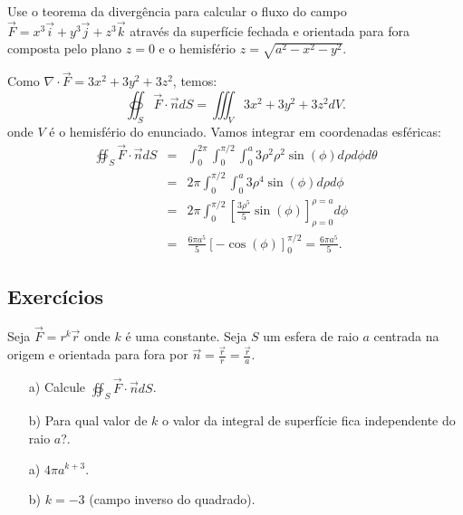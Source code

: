 \begin{exeresol} Use o teorema da divergência para calcular o fluxo do campo $\vec{F}=x^3\vec{i}+y^3\vec{j}+z^3\vec{k}$ através da superfície fechada e orientada para fora composta pelo plano $z=0$ e o hemisfério  $z=\sqrt{a^2-x^2-y^2}$.
\end{exeresol}
\begin{resol}
Como $\nabla\cdot \vec{F}=3x^2+3y^2+3z^2$, temos: 
$$
\oiint_S \vec{F}\cdot \vec{n} dS=\iiint_V 3x^2+3y^2+3z^2 dV.
$$
onde $V$ é o hemisfério do enunciado. Vamos integrar em coordenadas esféricas:
\begin{eqnarray*}
\oiint_S \vec{F}\cdot \vec{n} dS&=&\int_0^{2\pi} \int_0^{\pi/2} \int_0^a 3\rho^2 \rho^2\sin(\phi)d\rho d\phi d\theta\\
&=&2\pi \int_0^{\pi/2} \int_0^a 3\rho^4\sin(\phi)d\rho d\phi \\
&=&2\pi \int_0^{\pi/2} \left[ \frac{3\rho^5}{5}\sin(\phi)\right]_{\rho=0}^{\rho=a} d\phi \\
&=&\frac{6\pi a^5}{5} \left[ -\cos(\phi)\right]_0^{\pi/2}=\frac{6\pi a^5}{5}. 
\end{eqnarray*}
\end{resol}


\begin{exeresol}


\end{exeresol}

\subsection*{Exercícios}
\begin{exer}
 Seja $\vec{F}=r^k\vec{r}$ onde $k$ é uma constante. Seja $S$ um esfera de raio $a$ centrada na origem e orientada para fora por $\vec{n}=\frac{\vec{r}}{r}=\frac{\vec{r}}{a}$. 
 \begin{itemize}
  \item[a)] Calcule $\oiint_S\vec{F}\cdot \vec{n}dS$.
  \item[b)] Para qual valor de $k$ o valor da integral de superfície fica independente do raio $a$?.
 \end{itemize}
\end{exer}
\begin{resp}
 \begin{itemize}
  \item[a)] $4\pi a^{k+3}$.
  \item[b)] $k=-3$ (campo inverso do quadrado).
 \end{itemize} 
\end{resp}

